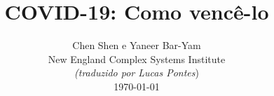 \documentclass[onecolumn,journal]{IEEEtran}
\begin{document}
\title{\color{Brown}  COVID-19: Como vencê-lo
\vspace{-0.35ex}}
\author{Chen Shen e Yaneer Bar-Yam \\ New England Complex Systems Institute \\
\vspace{+0.35ex}
\small{\textit{(traduzido por Lucas Pontes})}\\
 \today
  \vspace{-8ex} \\
\textbf{}
 }

\maketitle




\thispagestyle{empty} %





\end{document}
